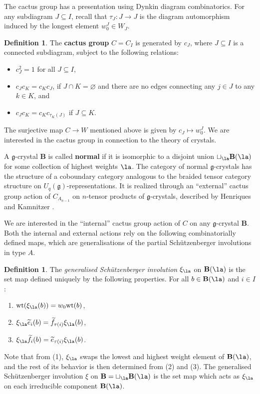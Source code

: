 \documentclass[11pt,reqno]{amsart}
\numberwithin{equation}{section}
\theoremstyle{definition}
\newtheorem{Definition}[equation]{Definition}
\theoremstyle{named}
\newcommand{\bB}{\mathbf{B}}
\newcommand{\fg}{\mathfrak{g}}
\renewcommand{\emptyset}{\varnothing}
\renewcommand{\tilde}[1]{\widetilde{#1}}
\newcommand{\wt}{\text{wt}}
\begin{document}
The cactus group has a presentation using Dynkin diagram combinatorics. For any subdiagram $J \subseteq I$, recall that $\tau_J:J\to J$ is the diagram automorphism induced by the longest element $w_0^J \in W_J$.
\begin{Definition}
	The \textbf{cactus group} $C=C_I$ is generated by $c_J$, where $J \subseteq I$ is a connected subdiagram, subject to the following relations:
	\begin{itemize}
		\item[(i)] $c_J^2=1$ for all $J \subseteq I$,
		\item[(ii)] $c_Jc_K=c_Kc_J$, if $J \cap K=\emptyset$ and there are no edges connecting any $j \in J$ to any $k\in K$, and
		\item[(iii)] $c_Jc_K=c_Kc_{\tau_K(J)}$ if $J \subseteq K$.
	\end{itemize}
\end{Definition}
The surjective map $C \to W$ mentioned above is given by $c_J \mapsto w_0^J$. We are interested in the cactus group in connection to the theory of crystals. 

A $\fg$-crystal $\bB$ is called \textbf{normal} if it is isomorphic to a disjoint union $\sqcup_\la \bB(\la)$ for some collection of highest weights $\la$. The category of normal $\fg$-crystals has the structure of a coboundary category analogous to the braided tensor category structure on $U_q(\fg)$-representations. It is realized through an ``external'' cactus group action of $C_{A_{n-1}}$ on $n$-tensor products of $\fg$-crystals, described by Henriques and Kamnitzer \cite[Theorems 6,7]{HK06}. 

We are interested in the ``internal'' cactus group action of $C$ on any $\fg$-crystal $\bB$. Both the internal and external actions 
rely on the following combinatorially defined maps, which are generalisations of the partial Sch\"utzenberger involutions in type $A$.

\begin{Definition} \label{def:genSchutz}
The \textit{generalised Sch\"utzenberger involution} $\xi_\la$ on $\bB(\la)$ is the set map defined uniquely by the following properties. For all $b \in \bB(\la)$ and $i \in I$:
	\begin{enumerate}
		\item $\wt(\xi_\la(b))=w_0\wt(b)$,
		\item $\xi_\la \tilde{e}_i(b)=\tilde{f}_{\tau(i)} \xi_\la(b)$,
		\item $\xi_\la \tilde{f}_i(b)=\tilde{e}_{\tau(i)} \xi_\la(b)$.
	\end{enumerate}	
	Note that from (1), $\xi_\la$ swaps the lowest and highest weight element of $\bB(\la)$, and the rest of its behavior is then determined from (2) and (3). The generalised Sch\"utzenberger involution $\xi$ on $\bB=\sqcup_\la \bB(\la)$ is the set map which acts as $\xi_\la$ on each irreducible component $\bB(\la)$.
\end{Definition}
\end{document}

